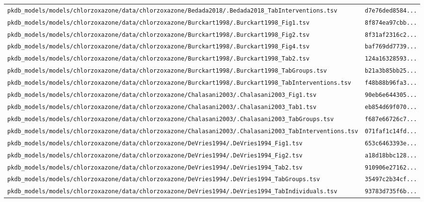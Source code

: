 \begin{longtable}{ll}
\texttt{pkdb\_models/models/chlorzoxazone/data/chlorzoxazone/Bedada2018/.Bedada2018\_TabInterventions.tsv} & \texttt{d7e76ded8584...} \\
\texttt{pkdb\_models/models/chlorzoxazone/data/chlorzoxazone/Burckart1998/.Burckart1998\_Fig1.tsv} & \texttt{8f874ea97cbb...} \\
\texttt{pkdb\_models/models/chlorzoxazone/data/chlorzoxazone/Burckart1998/.Burckart1998\_Fig2.tsv} & \texttt{8f31af2316c2...} \\
\texttt{pkdb\_models/models/chlorzoxazone/data/chlorzoxazone/Burckart1998/.Burckart1998\_Fig4.tsv} & \texttt{baf769dd7739...} \\
\texttt{pkdb\_models/models/chlorzoxazone/data/chlorzoxazone/Burckart1998/.Burckart1998\_Tab2.tsv} & \texttt{124a16328593...} \\
\texttt{pkdb\_models/models/chlorzoxazone/data/chlorzoxazone/Burckart1998/.Burckart1998\_TabGroups.tsv} & \texttt{b21a3b85bb25...} \\
\texttt{pkdb\_models/models/chlorzoxazone/data/chlorzoxazone/Burckart1998/.Burckart1998\_TabInterventions.tsv} & \texttt{f48b88b96fa3...} \\
\texttt{pkdb\_models/models/chlorzoxazone/data/chlorzoxazone/Chalasani2003/.Chalasani2003\_Fig1.tsv} & \texttt{90eb6e644305...} \\
\texttt{pkdb\_models/models/chlorzoxazone/data/chlorzoxazone/Chalasani2003/.Chalasani2003\_Tab1.tsv} & \texttt{eb854d69f070...} \\
\texttt{pkdb\_models/models/chlorzoxazone/data/chlorzoxazone/Chalasani2003/.Chalasani2003\_TabGroups.tsv} & \texttt{f687e66726c7...} \\
\texttt{pkdb\_models/models/chlorzoxazone/data/chlorzoxazone/Chalasani2003/.Chalasani2003\_TabInterventions.tsv} & \texttt{071faf1c14fd...} \\
\texttt{pkdb\_models/models/chlorzoxazone/data/chlorzoxazone/DeVries1994/.DeVries1994\_Fig1.tsv} & \texttt{653c6463393e...} \\
\texttt{pkdb\_models/models/chlorzoxazone/data/chlorzoxazone/DeVries1994/.DeVries1994\_Fig2.tsv} & \texttt{a18d18bbc128...} \\
\texttt{pkdb\_models/models/chlorzoxazone/data/chlorzoxazone/DeVries1994/.DeVries1994\_Tab2.tsv} & \texttt{910906e27162...} \\
\texttt{pkdb\_models/models/chlorzoxazone/data/chlorzoxazone/DeVries1994/.DeVries1994\_TabGroups.tsv} & \texttt{35497c2b34cf...} \\
\texttt{pkdb\_models/models/chlorzoxazone/data/chlorzoxazone/DeVries1994/.DeVries1994\_TabIndividuals.tsv} & \texttt{93783d735f6b...} \\

\end{longtable}
